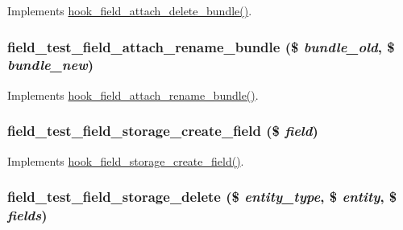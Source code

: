 Implements \hyperlink{group__field__attach_gac2aac33854dd18a2037a13b133c26481}{hook\_\-field\_\-attach\_\-delete\_\-bundle()}. \hypertarget{field__test_8storage_8inc_a77f0715aaf93ca0aa9bc787d4ebafa06}{
\subsubsection[{field\_\-test\_\-field\_\-attach\_\-rename\_\-bundle}]{\setlength{\rightskip}{0pt plus 5cm}field\_\-test\_\-field\_\-attach\_\-rename\_\-bundle (\$ {\em bundle\_\-old}, \/  \$ {\em bundle\_\-new})}}
\label{field__test_8storage_8inc_a77f0715aaf93ca0aa9bc787d4ebafa06}
Implements \hyperlink{group__field__attach_gaf218d913150bda6004d5d8e112d3174a}{hook\_\-field\_\-attach\_\-rename\_\-bundle()}. \hypertarget{field__test_8storage_8inc_a40793876a6a577af289bfcc98d4d3b17}{
\subsubsection[{field\_\-test\_\-field\_\-storage\_\-create\_\-field}]{\setlength{\rightskip}{0pt plus 5cm}field\_\-test\_\-field\_\-storage\_\-create\_\-field (\$ {\em field})}}
\label{field__test_8storage_8inc_a40793876a6a577af289bfcc98d4d3b17}
Implements \hyperlink{group__field__storage_gac345df04a43f63941dd69c7d18e83e00}{hook\_\-field\_\-storage\_\-create\_\-field()}. \hypertarget{field__test_8storage_8inc_a724f6b8c3ae75b4e9ace35cbe8981e83}{
\subsubsection[{field\_\-test\_\-field\_\-storage\_\-delete}]{\setlength{\rightskip}{0pt plus 5cm}field\_\-test\_\-field\_\-storage\_\-delete (\$ {\em entity\_\-type}, \/  \$ {\em entity}, \/  \$ {\em fields})}}
